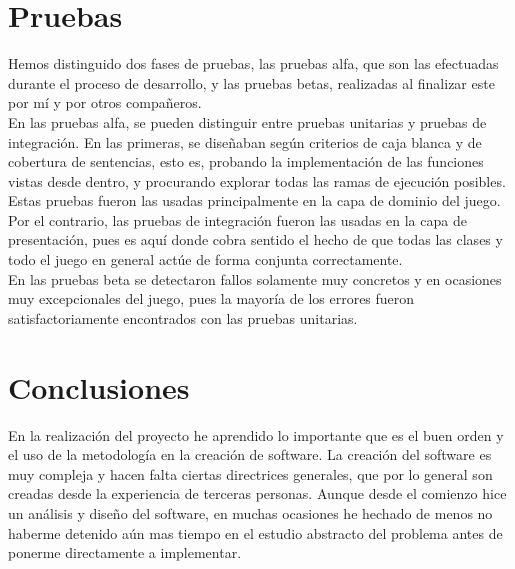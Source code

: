 \documentclass[a4paper,11pt]{article} %
\begin{document}
\section{Pruebas}
\noindent
Hemos distinguido dos fases de pruebas, las pruebas alfa, que son las
efectuadas durante el proceso de desarrollo, y las pruebas betas,
realizadas al finalizar este por mí y por otros compañeros.\\

\noindent
En las pruebas alfa, se pueden distinguir entre pruebas unitarias y
pruebas de integración. En las primeras, se diseñaban según criterios
de caja blanca y de cobertura de sentencias, esto es, probando la
implementación de las funciones vistas desde dentro, y procurando
explorar todas las ramas de ejecución posibles. Estas pruebas fueron
las usadas principalmente en la capa de dominio del juego. Por el
contrario, las pruebas de integración fueron las usadas en la capa de
presentación, pues es aquí donde cobra sentido el hecho de que todas
las clases y todo el juego en general actúe de forma conjunta
correctamente.\\

\noindent
En las pruebas beta se detectaron fallos solamente muy concretos y en
ocasiones muy excepcionales del juego, pues la mayoría de los errores
fueron satisfactoriamente encontrados con las pruebas unitarias.

\section{Conclusiones}
\noindent
En la realización del proyecto he aprendido lo importante que es el
buen orden y el uso de la metodología en la creación de software. La
creación del software es muy compleja y hacen falta ciertas
directrices generales, que por lo general son creadas desde la
experiencia de terceras personas. Aunque desde el comienzo hice un
análisis y diseño del software, en muchas ocasiones he hechado de
menos no haberme detenido aún mas tiempo en el estudio abstracto del
problema antes de ponerme directamente a implementar.

\nocite{pressman}
\nocite{laur04}
\nocite{raym01}
\nocite{stal04}
\nocite{mitt04}
\nocite{sdlweb}
\nocite{sdlosluca}
\nocite{cppref}
\nocite{warh}

\clearpage
{}
{}


\end{document}
